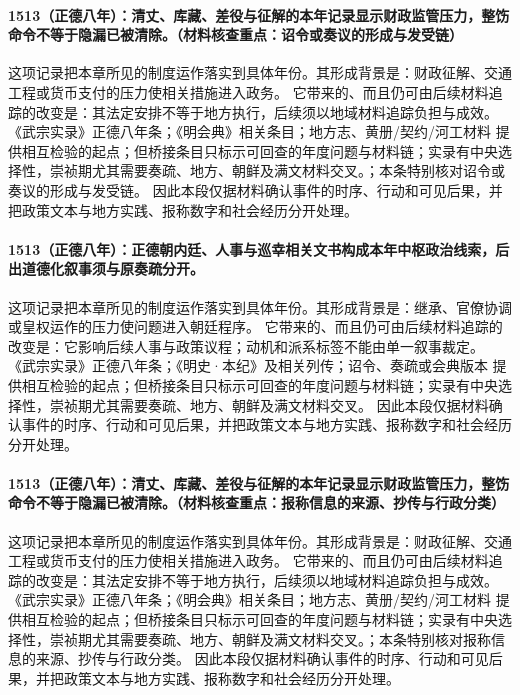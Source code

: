 \paragraph{1513（正德八年）：清丈、库藏、差役与征解的本年记录显示财政监管压力，整饬命令不等于隐漏已被清除。（材料核查重点：诏令或奏议的形成与发受链）} 这项记录把本章所见的制度运作落实到具体年份。其形成背景是：财政征解、交通工程或货币支付的压力使相关措施进入政务。 它带来的、而且仍可由后续材料追踪的改变是：其法定安排不等于地方执行，后续须以地域材料追踪负担与成效。 《武宗实录》正德八年条；《明会典》相关条目；地方志、黄册/契约/河工材料 提供相互检验的起点；但桥接条目只标示可回查的年度问题与材料链；实录有中央选择性，崇祯期尤其需要奏疏、地方、朝鲜及满文材料交叉。；本条特别核对诏令或奏议的形成与发受链。 因此本段仅据材料确认事件的时序、行动和可见后果，并把政策文本与地方实践、报称数字和社会经历分开处理。

\paragraph{1513（正德八年）：正德朝内廷、人事与巡幸相关文书构成本年中枢政治线索，后出道德化叙事须与原奏疏分开。} 这项记录把本章所见的制度运作落实到具体年份。其形成背景是：继承、官僚协调或皇权运作的压力使问题进入朝廷程序。 它带来的、而且仍可由后续材料追踪的改变是：它影响后续人事与政策议程；动机和派系标签不能由单一叙事裁定。 《武宗实录》正德八年条；《明史·本纪》及相关列传；诏令、奏疏或会典版本 提供相互检验的起点；但桥接条目只标示可回查的年度问题与材料链；实录有中央选择性，崇祯期尤其需要奏疏、地方、朝鲜及满文材料交叉。 因此本段仅据材料确认事件的时序、行动和可见后果，并把政策文本与地方实践、报称数字和社会经历分开处理。

\paragraph{1513（正德八年）：清丈、库藏、差役与征解的本年记录显示财政监管压力，整饬命令不等于隐漏已被清除。（材料核查重点：报称信息的来源、抄传与行政分类）} 这项记录把本章所见的制度运作落实到具体年份。其形成背景是：财政征解、交通工程或货币支付的压力使相关措施进入政务。 它带来的、而且仍可由后续材料追踪的改变是：其法定安排不等于地方执行，后续须以地域材料追踪负担与成效。 《武宗实录》正德八年条；《明会典》相关条目；地方志、黄册/契约/河工材料 提供相互检验的起点；但桥接条目只标示可回查的年度问题与材料链；实录有中央选择性，崇祯期尤其需要奏疏、地方、朝鲜及满文材料交叉。；本条特别核对报称信息的来源、抄传与行政分类。 因此本段仅据材料确认事件的时序、行动和可见后果，并把政策文本与地方实践、报称数字和社会经历分开处理。

